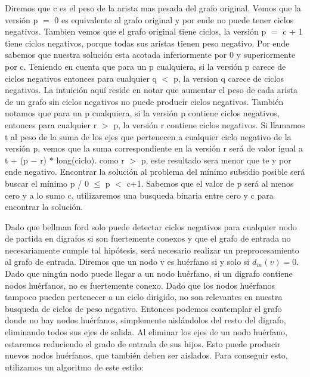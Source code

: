 Diremos que c es el peso de la arista mas pesada del grafo original. Vemos que la versión p $=$ 0 es equivalente al grafo original y por ende no puede tener ciclos negativos. Tambien vemos que el grafo original tiene ciclos, la versión p $=$ c + 1 tiene ciclos negativos, porque todas sus aristas tienen peso negativo. Por ende sabemos que nuestra solución esta acotada inferiormente por 0 y superiormente por c. Teniendo en cuenta que para un p cualquiera, si la versión p carece de ciclos negativos entonces para cualquier q $<$ p, la version q carece de ciclos negativos. La intuición aquí reside en notar que aumentar el peso de cada arista de un grafo sin ciclos negativos no puede producir ciclos negativos. También notamos que para un p cualquiera, si la versión p contiene ciclos negativos, entonces para cualquier r $>$ p, la versión r contiene ciclos negativos. Si llamamos t al peso de la suma de los ejes que pertenecen a cualquier ciclo negativo de la versión p, vemos que la suma correspondiente en la versión r será de valor igual a t + (p $-$ r) $\ast$ long(ciclo). como r $>$ p, este resultado sera menor que te y por ende negativo. Encontrar la solución al problema del mínimo subsidio posible será buscar el mínimo p / 0 $\leq$ p $<$ c+1. Sabemos que el valor de p será al menos cero y a lo sumo c, utilizaremos una busqueda binaria entre cero y c para encontrar la solución.
\\
\par
Dado que bellman ford solo puede detectar ciclos negativos para cualquier nodo de partida en digrafos si son fuertemente conexos y que el grafo de entrada no necesariamente cumple tal hipótesis, será necesario realizar un preprocesamiento al grafo de entrada. Diremos que un nodo v es huérfano si y solo si $d_{in} (v) = 0$. Dado que ningún nodo puede llegar a un nodo huérfano, si un digrafo contiene nodos huérfanos, no es fuertemente conexo. Dado que los nodos huérfanos tampoco pueden pertenecer a un ciclo dirigido, no son relevantes en nuestra busqueda de ciclos de peso negativo. Entonces podemos contemplar el grafo donde no hay nodos huérfanos, simplemente aislándolos del resto del digrafo, eliminando todos sus ejes de salida. Al eliminar los ejes de un nodo huérfano, estaremos reduciendo el grado de entrada de sus hijos. Esto puede producir nuevos nodos huérfanos, que también deben ser aislados. Para conseguir esto, utilizamos un algoritmo de este estilo:
